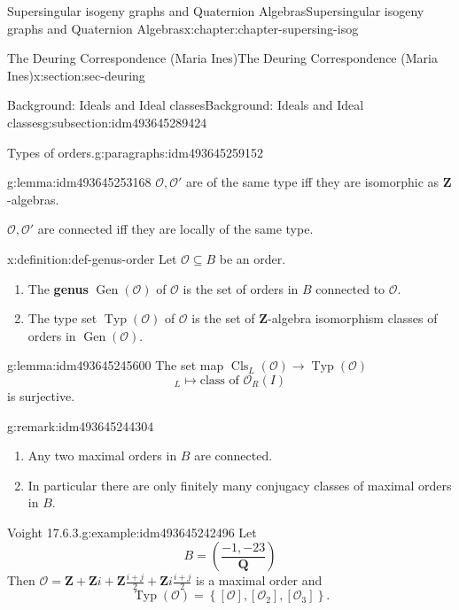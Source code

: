 \documentclass[oneside,10pt,]{book}
\newcommand{\terminology}[1]{\textbf{#1}}
\numberwithin{equation}{section}
\newcommand{\legendre}[2]{\left(\frac{#1}{#2}\right)}
\newcommand{\lb}{[}
\newcommand{\rb}{]}
\newcommand{\ZZ}{\mathbf{Z}}
\newcommand{\QQ}{\mathbf{Q}}
\newcommand{\ints}{\mathcal{O}}
\begin{document}
\begin{chapterptx}{Supersingular isogeny graphs and Quaternion Algebras}{}{Supersingular isogeny graphs and Quaternion Algebras}{}{}{x:chapter:chapter-supersing-isog}
\begin{sectionptx}{The Deuring Correspondence (Maria Ines)}{}{The Deuring Correspondence (Maria Ines)}{}{}{x:section:sec-deuring}
\begin{subsectionptx}{Background: Ideals and Ideal classes}{}{Background: Ideals and Ideal classes}{}{}{g:subsection:idm493645289424}
\begin{paragraphs}{Types of orders.}{g:paragraphs:idm493645259152}
\begin{lemma}{}{}{g:lemma:idm493645253168}
\(\ints,\ints'\) are of the same type iff they are isomorphic as \(\ZZ\)-algebras.%
\par
\(\ints,\ints'\) are connected iff they are locally of the same type.%
\end{lemma}
\begin{definition}{}{x:definition:def-genus-order}%
Let \(\ints \subseteq B\) be an order.%
\begin{enumerate}
\item{}The \terminology{genus} \(\operatorname{Gen}(\ints)\) of \(\ints \) is the set of orders in \(B \) connected to \(\ints\).%
\item{}The type set \(\operatorname{Typ}(\ints)\) of \(\ints\) is the set of \(\ZZ\)-algebra isomorphism classes of orders in \(\operatorname{Gen} (\ints)\).%
\end{enumerate}
%
\end{definition}
\begin{lemma}{}{}{g:lemma:idm493645245600}%
The set map \(\operatorname{Cls}_L(\ints) \to \operatorname{Typ}(\ints)\)%
\begin{equation*}
[ I]_L \mapsto \text{class of } \ints_R(I)
\end{equation*}
is surjective.%
\end{lemma}
\begin{remark}{}{g:remark:idm493645244304}%
%
\begin{enumerate}
\item{}Any two maximal orders in \(B\) are connected.%
\item{}In particular there are only finitely many conjugacy classes of maximal orders in \(B\).%
\end{enumerate}
%
\end{remark}
\begin{example}{Voight 17.6.3.}{g:example:idm493645242496}%
Let%
\begin{equation*}
B = \legendre{-1,-23}{\QQ}
\end{equation*}
Then \(\ints=  \ZZ +  \ZZ i + \ZZ \frac{i+j}{2} + \ZZ i \frac{i+j}{2}\) is a maximal order and%
\begin{equation*}
\operatorname{Typ}(\ints) =  \left\{ \lb \ints \rb , \lb \ints_2 \rb , \lb \ints_3 \rb \right\}\text{.}
\end{equation*}
%
\end{example}
\end{paragraphs}%
\end{subsectionptx}
%
%
\typeout{************************************************}

\end{sectionptx}
\end{chapterptx}
\end{document}
